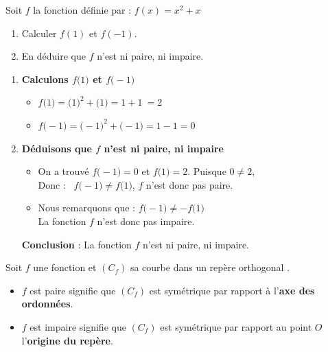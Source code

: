 \documentclass[10pt, a4paper]{article}
\begin{document}
\begin{Application}[][25 min]
Soit $f$ la fonction définie par : $f(x) = x^2 + x$
\begin{enumerate}[leftmargin=*,itemsep=0.5pt]
    \item Calculer $f(1)$ et $f(-1)$.
    \item En déduire que $f$ n'est ni paire, ni impaire.
\end{enumerate}
\end{Application}

\begin{Solution}[APPLICATION][5]
\begin{enumerate}[leftmargin=*,itemsep=0.5pt]

    \item \textbf{Calculons $f\big(1\big)$ et $f\big(-1\big)$}
    \begin{itemize}[leftmargin=*,itemsep=0.5pt]
        \item $f\big(1\big) = \big(1\big)^2 + \big(1\big)
     = 1 + 1 \
     = 2$
        \item $f\big(-1\big) = \big(-1\big)^2 + \big(-1\big)
     = 1 - 1
     = 0$
    \end{itemize}

    \item \textbf{Déduisons que $f$ n'est ni paire, ni impaire}
    \begin{itemize}[leftmargin=*,itemsep=0.5pt]
        \item On a trouvé $f\big(-1\big) = 0$ et $f\big(1\big) = 2$.
        Puisque $0 \neq 2$, \\
        Donc :~  $f\big(-1\big) \neq f\big(1\big)$, 
        $f$ n'est donc pas paire.

        \item  Nous remarquons que :
        $f\big(-1\big) \neq -f\big(1\big)$ \\
        La fonction $f$ n'est donc pas impaire.
    \end{itemize}
    \textbf{Conclusion} : La fonction $f$ n'est ni paire, ni impaire.

\end{enumerate}
\end{Solution}

\begin{Propriete}[]
Soit $f$ une fonction et $(C_f)$ sa courbe dans un repère orthogonal \Oij.
\begin{itemize}[leftmargin=*,itemsep=0.5pt]
    \item $f$ est paire signifie que $(C_f)$ est symétrique par rapport à l'\textbf{axe des ordonnées}.
    \item $f$ est impaire signifie que $(C_f)$ est symétrique par rapport au point $O$ l'\textbf{origine du repère}.
\end{itemize}
\end{Propriete}
\end{document}
